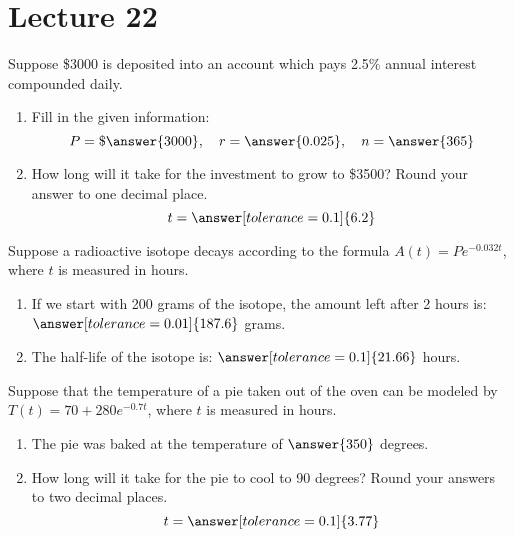 \documentclass{ximera}
\begin{document}
 \section{Lecture 22}
 
  \begin{problem}\label{prob:160hom9prob1} 
Suppose \$3000 is deposited into an account which pays 2.5\% annual interest compounded daily.  
 \begin{enumerate}
 \item Fill in the given information:
 $$P=\$\answer{3000},\quad r=\answer{0.025},\quad n=\answer{365}$$
 \item How long will it take for the investment to grow to \$3500?
 Round your answer to one decimal place.
 $$t=\answer[tolerance=0.1]{6.2}$$
 \end{enumerate}
 \end{problem}
 
 \begin{problem}\label{prob:160hom9prob2} 
 Suppose a radioactive isotope decays according to the formula $A(t)=Pe^{-0.032t}$, where $t$ is measured in hours.  
 \begin{enumerate}
     \item 
If we start with 200 grams of the isotope, the amount left after 2 hours is: $\answer[tolerance=0.01]{187.6}$ grams.
\item The half-life of the isotope is: $\answer[tolerance=0.1]{21.66}$ hours.
\end{enumerate}
\end{problem}

\begin{problem}\label{prob:160hom9prob3}
 Suppose that the temperature of a pie taken out of the oven can be modeled by $T(t)=70+280e^{-0.7t}$, where $t$ is measured in hours.
 \begin{enumerate}
     \item The pie was baked at the temperature of $\answer{350}$ degrees.
     \item How long will it take for the pie to cool to 90 degrees?  Round your answers to two decimal places.
     $$t=\answer[tolerance=0.1]{3.77}$$
 \end{enumerate}
 \end{problem}
 
 
\end{document}
